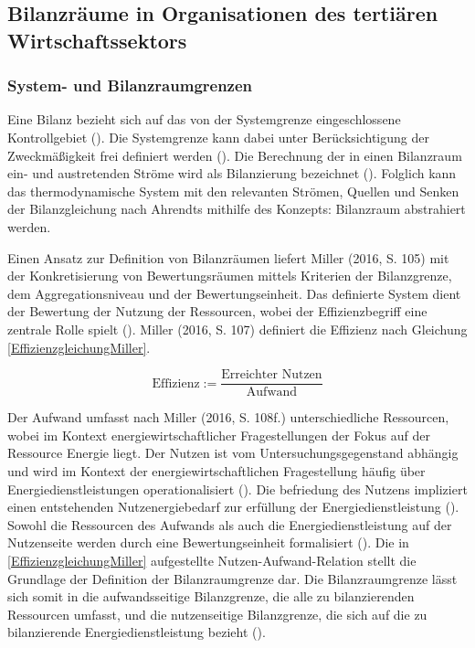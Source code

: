 \subsection{Bilanzräume in Organisationen des tertiären Wirtschaftssektors}


\subsubsection{System- und Bilanzraumgrenzen}
Eine Bilanz bezieht sich auf das von der Systemgrenze eingeschlossene Kontrollgebiet (\cite[Kapitel 1.5]{Ahrendts.2014}). 
Die Systemgrenze kann dabei unter Berücksichtigung der Zweckmäßigkeit frei definiert werden (\cite[Kapitel 1.5]{Ahrendts.2014}).
Die Berechnung der in einen Bilanzraum ein- und austretenden Ströme wird als Bilanzierung bezeichnet (\cite[S. 65]{Rönsch.2015}).
Folglich kann das thermodynamische System mit den relevanten Strömen, Quellen und Senken der Bilanzgleichung nach Ahrendts mithilfe des Konzepts: 
Bilanzraum abstrahiert werden. 

Einen Ansatz zur Definition von Bilanzräumen liefert Miller (2016, S. 105) mit der Konkretisierung von Bewertungsräumen mittels Kriterien der Bilanzgrenze, dem 
Aggregationsniveau und der Bewertungseinheit. Das definierte System dient der Bewertung der Nutzung der Ressourcen, wobei der Effizienzbegriff eine zentrale Rolle spielt 
(\cite[S. 107]{Miller.2016}).
Miller (2016, S. 107) definiert die Effizienz nach Gleichung \eqref{EffizienzgleichungMiller}.

\begin{equation}
    \text{Effizienz} := \frac{\text{Erreichter Nutzen}}{\text{Aufwand}}
    \label{EffizienzgleichungMiller}
\end{equation}

Der Aufwand umfasst nach Miller (2016, S. 108f.) unterschiedliche Ressourcen, wobei im Kontext energiewirtschaftlicher Fragestellungen der Fokus auf der Ressource Energie liegt.
Der Nutzen ist vom Untersuchungsgegenstand abhängig und wird im Kontext der energiewirtschaftlichen Fragestellung häufig über Energiedienstleistungen operationalisiert (\cite[S. 107]{Miller.2016}). 
Die befriedung des Nutzens impliziert einen entstehenden Nutzenergiebedarf zur erfüllung der Energiedienstleistung (\cite[S. 107]{Miller.2016}).
Sowohl die Ressourcen des Aufwands als auch die Energiedienstleistung auf der Nutzenseite werden durch eine Bewertungseinheit formalisiert (\cite{Miller.2016}).
Die in \eqref{EffizienzgleichungMiller} aufgestellte Nutzen-Aufwand-Relation stellt die Grundlage der Definition der Bilanzraumgrenze dar.
Die Bilanzraumgrenze lässt sich somit in die aufwandsseitige Bilanzgrenze, die alle zu bilanzierenden Ressourcen umfasst, und die nutzenseitige Bilanzgrenze, 
die sich auf die zu bilanzierende Energiedienstleistung bezieht (\cite[S. 111]{Miller.2016}).

